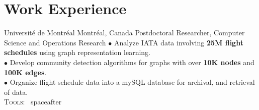 \documentclass[10pt]{article} %
\begin{document}
\makeprofile %


\vspace{-\baselineskip} %


\section{Work Experience}





{} %
{Universit\'{e} de Montr\'{e}al} %
{Montr\'{e}al, Canada} %
{Postdoctoral Researcher, Computer Science and Operations Research} %
{
	$\bullet$ Analyze IATA data involving \textbf{25M flight schedules} using graph representation learning.\\
	$\bullet$ Develop community detection algorithms for graphs with over \textbf{10K nodes} and \textbf{100K edges}.\\
	$\bullet$ Organize flight schedule data into a mySQL database for  archival, and retrieval of data.\\
	\textsc{Tools:}~
} %
{spaceafter}

\end{document}
